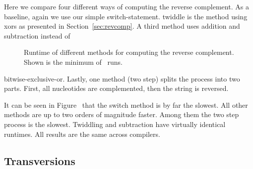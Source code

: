 \documentclass[10pt,letterpaper]{article}
\begin{document}
Here we compare four different ways of computing the reverse complement. As a baseline, again we use our simple switch-statement. twiddle is the method using xors as presented in Section~\ref{sec:revcomp}. A third method uses addition and subtraction instead of

\begin{wrapfigure}{l}{85mm}
    \caption{Runtime of different methods for computing the reverse complement. Shown is the minimum of \gZhashZruns~runs.}
\end{wrapfigure}
\noindent bitwise-exclusive-or. Lastly, one method (two step) splits the process into two parts. First, all nucleotides are complemented, then the string is reversed.

It can be seen in Figure~{} that the switch method is by far the slowest. All other methods are up to two orders of magnitude faster. Among them the two step process is the slowest. Twiddling and subtraction have virtually identical runtimes. All results are the same across compilers.




\subsection{Transversions}
\end{document}
